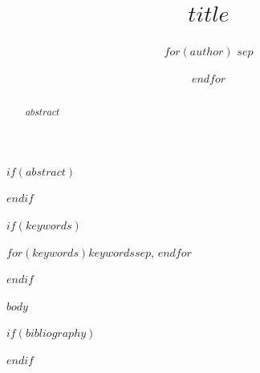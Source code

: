 \documentclass[conference]{IEEEtran}
\begin{document}
\title{$title$}

\author{%
$for(author)$
$sep$
\and
$endfor$
}

\maketitle

$if(abstract)$
\begin{abstract}
$abstract$
\end{abstract}
$endif$

$if(keywords)$
\begin{IEEEkeywords}
$for(keywords)$$keywords$$sep$, $endfor$
\end{IEEEkeywords}
$endif$

$body$

$if(bibliography)$


$endif$
\end{document}
